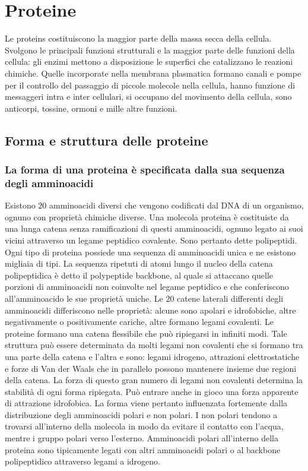 \chapter{Proteine}
Le proteins costituiscono la maggior parte della massa secca della cellula. Svolgono le principali funzioni strutturali e la maggior parte delle funzioni
della cellula: gli enzimi mettono a disposizione le superfici che catalizzano le reazioni chimiche. Quelle incorporate nella membrana plasmatica formano 
canali e pompe per il controllo del passaggio di piccole molecole nella cellula, hanno funzione di messaggeri intra e inter cellulari, si occupano del
movimento della cellula, sono anticorpi, tossine, ormoni e mille altre funzioni. 
\section{Forma e struttura delle proteine}
\subsection{La forma di una proteina \`e specificata dalla sua sequenza degli amminoacidi}
Esistono $20$ amminoacidi diversi che vengono codificati dal DNA di un organismo, ognuno con propriet\`a chimiche diverse. Una molecola proteina \`e
costituiste da una lunga catena senza ramificazioni di questi amminoacidi, ognuno legato ai suoi vicini attraverso un legame peptidico covalente. Sono
pertanto dette polipeptidi. Ogni tipo di proteina possiede una sequenza di amminoacidi unica e ne esistono migliaia di tipi. La sequenza ripetuti di atomi 
lungo il nucleo della catena polipeptidica \`e detto il polypeptide backbone, al quale si attaccano quelle porzioni di amminoacidi non coinvolte nel 
legame peptidico e che conferiscono all'amminoacido le sue propriet\`a uniche. Le $20$ catene laterali differenti degli amminoacidi differiscono nelle
propriet\`a: alcune sono apolari e idrofobiche, altre negativamente o positivamente cariche, altre formano legami covalenti. Le proteine formano una 
catena flessibile che pu\`o ripiegarsi in infiniti modi. Tale struttura pu\`o essere determinata da molti legami non covalenti che si formano tra una 
parte della catena e l'altra e sono: legami idrogeno, attrazioni elettrostatiche e forze di Van der Waals che in parallelo possono mantenere insieme due 
regioni della catena. La forza di questo gran numero di legami non covalenti determina la stabilit\`a di ogni forma ripiegata. Pu\`o entrare anche in gioco
una forza apparente di attrazione idrofobica. La forma viene pertanto influenzata fortemente dalla distribuzione degli amminoacidi polari e non polari. I 
non polari tendono a trovarsi all'interno della molecola in modo da evitare il contatto con l'acqua, mentre i gruppo polari verso l'esterno. Amminoacidi
polari all'interno della proteina sono tipicamente legati con altri amminoacidi polari o al backbone polipeptidico attraverso legami a idrogeno.
